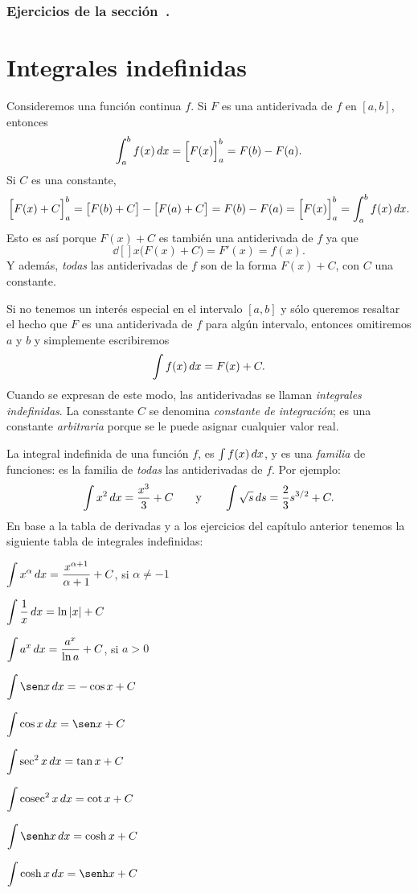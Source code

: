 \subsubsection*{Ejercicios de la sección~.}

\begin{enumerate}
  
\end{enumerate}  


\section{Integrales indefinidas}

Consideremos una función continua $f$. Si $F$ es una antiderivada de $f$ en $[a,b]$, entonces
\[
\int_a^b f(x)\,dx = \Big[F(x)\Big]_a^b = F(b)-F(a).
\]
Si $C$ es una constante, 
\[
  \Big[F(x)+C\Big]_a^b 
  = \big[F(b)+C\big]-\big[F(a)+C\big]= F(b)-F(a)
  = \Big[F(x)\Big]_a^b = \int_a^b f(x)\,dx.
\]
Esto es así porque $F(x)+C$ es también una antiderivada de $f$ ya que
\[
\dd[]{}{x} \big(F(x)+C\big) = F'(x) = f(x).
\]
Y además, \emph{todas} las antiderivadas de $f$ son de la forma $F(x)+C$, con $C$ una constante.

Si no tenemos un interés especial en el intervalo $[a,b]$ y sólo queremos resaltar el hecho que $F$ es una antiderivada de $f$ para algún intervalo, entonces omitiremos $a$ y $b$ y simplemente escribiremos
\[
\int f(x)\,dx = F(x)+C.
\]
Cuando se expresan de este modo, las antiderivadas se llaman \emph{integrales indefinidas}.
La consstante $C$ se denomina \emph{constante de integración}; es una constante \emph{arbitraria} porque se le puede asignar cualquier valor real.

La integral indefinida de una función $f$, es $\int f(x)\,dx$, y es una \emph{familia} de funciones: es la familia de \emph{todas} las antiderivadas de $f$. Por ejemplo:
\[
\int x^2\,dx = \frac{x^3}{3} + C 
\qquad\text y \qquad
\int \sqrt{s}\,ds = \frac23 s^{3/2}+C.
\]
En base a la tabla de derivadas y a los ejercicios del capítulo anterior tenemos la siguiente tabla de integrales indefinidas:

\begin{multicols}{2}
  $\displaystyle \int x^\alpha \,dx = \frac{x^{\alpha+1}}{\alpha+1} + C$, si $\alpha\neq -1$
  
  $\displaystyle \int \frac1x\,dx = \ln|x| + C$
  
  $\displaystyle \int a^x \,dx = \frac{a^x}{\ln a}  + C$, si $a>0$
  
  $\D \int \sen x\dx = -\cos x + C$
  
  $\D \int \cos x \dx = \sen x + C$
  
  $\displaystyle \int \sec^2 x\,dx = \tan x + C$
  
  $\displaystyle \int \operatorname{cosec}^2 x\,dx = \cot x + C$
  
  $\D \int \senh x \dx = \cosh x + C$
  
  $\D \int \cosh x \dx = \senh x + C$
  
\end{multicols}


